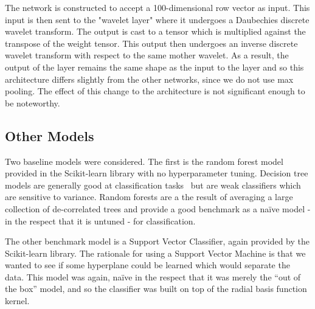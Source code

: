 The network is constructed to accept a 100-dimensional row vector as input.
This input is then sent to the "wavelet layer" where it undergoes a Daubechies discrete wavelet transform.
The output is cast to a tensor which is multiplied against the transpose of the weight tensor.
This output then undergoes an inverse discrete wavelet transform with respect to the same mother wavelet.
As a result, the output of the layer remains the same shape as the input to the layer and so this architecture differs slightly from the other networks, since we do not use max pooling. 
The effect of this change to the architecture is not significant enough to be noteworthy.

\subsection{Other Models} \label{other models}
Two baseline models were considered.
The first is the random forest model provided in the Scikit-learn library with no hyperparameter tuning.
Decision tree models are generally good at classification tasks~\cite{hastie01statisticallearning} but are weak classifiers which are sensitive to variance.
Random forests are a the result of averaging a large collection of de-correlated trees and provide a good benchmark as a na\"ive model - in the respect that it is untuned - for classification.

The other benchmark model is a Support Vector Classifier, again provided by the Scikit-learn library.
The rationale for using a Support Vector Machine is that we wanted to see if some hyperplane could be learned which would separate the data.
This model was again, na\"ive in the respect that it was merely the ``out of the box'' model, and so the classifier was built on top of the radial basis function kernel.
